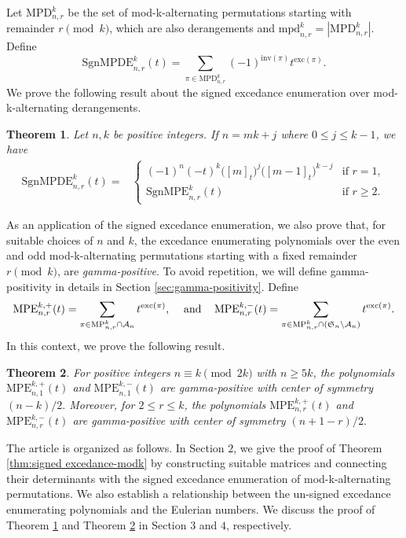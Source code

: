 \documentclass[12pt]{article}
\newcommand{\MP}{\mathrm{MP}}
\newcommand{\MPD}{\mathrm{MPD}}
\newcommand{\mpd}{\mathrm{mpd}}
\newcommand{\SMPDE}{\mathrm{SgnMPDE}}
\newcommand{\MPE}{\mathrm{MPE}}
\newcommand{\SMPE}{\mathrm{SgnMPE}}
\newcommand{\SSS}{\mathfrak{S}}
\newcommand{\AAA}{\mathcal{A}}
\newcommand{\inv}{\mathrm{inv}}
\newcommand{\exc}{\mathrm{exc}}
\newtheorem{theorem}{\bf Theorem}[section]
\begin{document}
Let $\MPD_{n,r}^k$ be the set of mod-k-alternating permutations starting with remainder $r \pmod k$, which are also derangements and $\mpd_{n,r}^k= |\MPD_{n,r}^k|$. Define
\[\SMPDE_{n,r}^k(t)= \sum_{\pi \in \MPD_{n,r}^k } (-1)^{\inv(\pi)}t^{\exc(\pi)}.\] 
We prove the following result about the 
signed excedance enumeration over mod-k-alternating derangements. 
 \begin{theorem}
 \label{thm:signed_Exc_derange_pap}
 Let $n,k$ be positive integers. If $n=mk+j$ where $0 \leq j \leq k-1$, we have 
\begin{align*}
\SMPDE_{n,r}^k(t)  
= & \begin{cases}
(-1)^{n} (-t)^k \big([m]_t \big) ^ j \big([m-1]_t \big)^{k-j}  & \text {if $r=1$},\\
 \SMPE_{n,r}^k(t)  & \text {if $r \geq 2$.}
\end{cases}
\end{align*} 
\end{theorem} 
  

As an application of the signed excedance enumeration, we also prove that, for suitable choices of $n$ and $k$, the excedance enumerating polynomials over the even and odd mod-k-alternating permutations starting with a fixed remainder $r \pmod k$, are {\it gamma-positive}. To avoid repetition, we will define gamma-positivity in details in Section \ref{sec:gamma-positivity}. Define
\[ \MPE_{n,r}^{k,+}(t)= \sum_{\pi \in \MP_{n,r}^k \cap \AAA_n} t^{\exc(\pi)}, \hspace{3 mm} \mbox{ and } \hspace{3 mm}
\MPE_{n,r}^{k,-}(t)= \sum_{\pi \in \MP_{n,r}^k \cap (\SSS_n \setminus \AAA_n)} t^{\exc(\pi)}. \] In this context, we prove the following result.

\begin{theorem}
\label{thm:gamma-pos-pap-even-odd-n-2mod4}
For positive integers $n\equiv k \pmod {2k}$ with $n \geq 5k$, the polynomials $\MPE_{n,1}^{k,+}(t)$ and $\MPE_{n,1}^{k,-}(t)$  are gamma-positive with center of symmetry  $(n-k)/2.$ Moreover, for $2 \leq r \leq k$, the polynomials $\MPE_{n,r}^{k,+}(t)$ and $\MPE_{n,r}^{k,-}(t)$  are gamma-positive with center of symmetry  $(n+1-r)/2.$ 
\end{theorem} 


The article is organized as follows. In Section $2$, we give the proof of Theorem \ref{thm:signed excedance-modk} by constructing suitable matrices and connecting their determinants with the signed excedance enumeration of mod-k-alternating permutations. We also establish a relationship between the un-signed excedance enumerating polynomials and the Eulerian numbers. We discuss the proof of Theorem \ref{thm:signed_Exc_derange_pap} and Theorem \ref{thm:gamma-pos-pap-even-odd-n-2mod4} in Section $3$ and $4$, respectively. 
\end{document}
